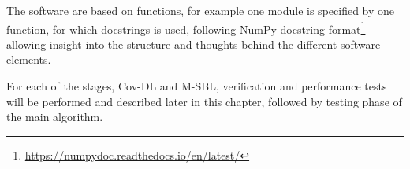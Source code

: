 The software are based on functions, for example one module is specified by one function, for which docstrings is used, following NumPy docstring format\footnote{\url{https://numpydoc.readthedocs.io/en/latest/}} allowing insight into the structure and thoughts behind the different software elements.

For each of the stages, Cov-DL and M-SBL, verification and performance tests will be performed and described later in this chapter, followed by testing phase of the main algorithm. 

